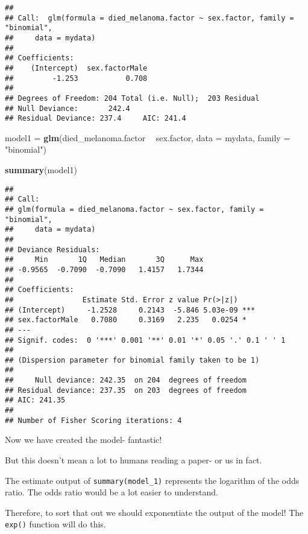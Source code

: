 \documentclass[]{book}
\makeatletter
\newenvironment{Shaded}{\begin{snugshade}}{\end{snugshade}}
\newcommand{\KeywordTok}[1]{\textcolor[rgb]{0.13,0.29,0.53}{\textbf{#1}}}
\newcommand{\DataTypeTok}[1]{\textcolor[rgb]{0.13,0.29,0.53}{#1}}
\newcommand{\StringTok}[1]{\textcolor[rgb]{0.31,0.60,0.02}{#1}}
\newcommand{\OperatorTok}[1]{\textcolor[rgb]{0.81,0.36,0.00}{\textbf{#1}}}
\newcommand{\NormalTok}[1]{#1}
\newenvironment{kframe}{%
\medskip{}
\setlength{\fboxsep}{.8em}
 \def\at@end@of@kframe{}%
 \ifinner\ifhmode%
  \def\at@end@of@kframe{\end{minipage}}%
  \begin{minipage}{\columnwidth}%
 \fi\fi%
 \def\FrameCommand##1{\hskip\@totalleftmargin \hskip-\fboxsep
 \colorbox{shadecolor}{##1}\hskip-\fboxsep
     \hskip-\linewidth \hskip-\@totalleftmargin \hskip\columnwidth}%
 \MakeFramed {\advance\hsize-\width
   \@totalleftmargin\z@ \linewidth\hsize
   \@setminipage}}%
 {\par\unskip\endMakeFramed%
 \at@end@of@kframe}
\renewenvironment{Shaded}{\begin{kframe}}{\end{kframe}}
\theoremstyle{definition}
\theoremstyle{definition}
\theoremstyle{definition}
\theoremstyle{remark}
\makeatother
\begin{document}
\begin{verbatim}
## 
## Call:  glm(formula = died_melanoma.factor ~ sex.factor, family = "binomial", 
##     data = mydata)
## 
## Coefficients:
##    (Intercept)  sex.factorMale  
##         -1.253           0.708  
## 
## Degrees of Freedom: 204 Total (i.e. Null);  203 Residual
## Null Deviance:       242.4 
## Residual Deviance: 237.4     AIC: 241.4
\end{verbatim}

\begin{Shaded}
\begin{Highlighting}[]
\NormalTok{model1 =}\StringTok{ }\KeywordTok{glm}\NormalTok{(died_melanoma.factor }\OperatorTok{~}\StringTok{ }\NormalTok{sex.factor, }\DataTypeTok{data =}\NormalTok{ mydata, }\DataTypeTok{family =} \StringTok{"binomial"}\NormalTok{)}

\KeywordTok{summary}\NormalTok{(model1)}
\end{Highlighting}
\end{Shaded}

\begin{verbatim}
## 
## Call:
## glm(formula = died_melanoma.factor ~ sex.factor, family = "binomial", 
##     data = mydata)
## 
## Deviance Residuals: 
##     Min       1Q   Median       3Q      Max  
## -0.9565  -0.7090  -0.7090   1.4157   1.7344  
## 
## Coefficients:
##                Estimate Std. Error z value Pr(>|z|)    
## (Intercept)     -1.2528     0.2143  -5.846 5.03e-09 ***
## sex.factorMale   0.7080     0.3169   2.235   0.0254 *  
## ---
## Signif. codes:  0 '***' 0.001 '**' 0.01 '*' 0.05 '.' 0.1 ' ' 1
## 
## (Dispersion parameter for binomial family taken to be 1)
## 
##     Null deviance: 242.35  on 204  degrees of freedom
## Residual deviance: 237.35  on 203  degrees of freedom
## AIC: 241.35
## 
## Number of Fisher Scoring iterations: 4
\end{verbatim}

Now we have created the model- fantastic!

But this doesn't mean a lot to humans reading a paper- or us in fact.

The estimate output of \texttt{summary(model\_1)} represents the
logarithm of the odds ratio. The odds ratio would be a lot easier to
understand.

Therefore, to sort that out we should exponentiate the output of the
model! The \texttt{exp()} function will do this.

\begin{Shaded}
\end{Shaded}
\end{document}
